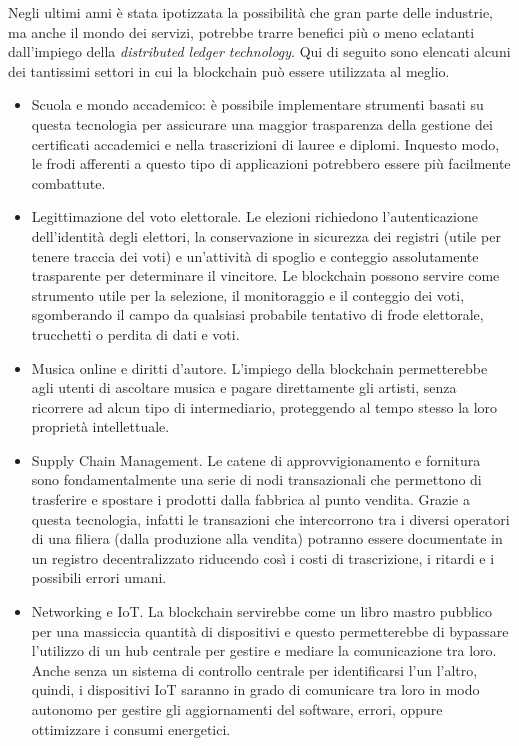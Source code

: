 Negli ultimi anni è stata ipotizzata la possibilità che gran parte delle industrie, ma anche il mondo dei servizi, potrebbe trarre benefici più o meno eclatanti dall’impiego della \textit{distributed ledger technology}\cite{Dieterich2017}.
Qui di seguito sono elencati alcuni dei tantissimi settori in cui la blockchain può essere utilizzata al meglio.

\begin{itemize}
    \item Scuola e mondo accademico: è possibile implementare strumenti basati su questa tecnologia per assicurare una maggior trasparenza della gestione dei certificati accademici e nella trascrizioni di lauree e diplomi. Inquesto modo, le frodi afferenti a questo tipo di applicazioni potrebbero essere più facilmente combattute.
    \item Legittimazione del voto elettorale. Le elezioni richiedono l’autenticazione dell’identità degli elettori, la conservazione in sicurezza dei registri (utile per tenere traccia dei voti) e un’attività di spoglio e conteggio assolutamente trasparente per determinare il vincitore. Le blockchain possono servire come strumento utile per la selezione, il monitoraggio e il conteggio dei voti, sgomberando il campo da qualsiasi probabile tentativo di frode elettorale, trucchetti o perdita di dati e voti.
    \item Musica online e diritti d'autore. L'impiego della blockchain permetterebbe agli utenti di ascoltare musica e  pagare direttamente gli artisti, senza ricorrere ad alcun tipo di intermediario, proteggendo al tempo stesso la loro proprietà intellettuale.
    \item Supply Chain Management. Le catene di approvvigionamento e fornitura sono fondamentalmente una serie di nodi transazionali che permettono di trasferire e spostare i prodotti dalla fabbrica al punto vendita. Grazie a questa tecnologia, infatti le transazioni che intercorrono tra i diversi operatori di una filiera (dalla produzione alla vendita) potranno essere documentate in un registro decentralizzato riducendo così i costi di trascrizione, i ritardi e i possibili errori umani.
    \item Networking e IoT. La blockchain servirebbe come un libro mastro pubblico per una massiccia quantità di dispositivi e questo permetterebbe di bypassare l’utilizzo di un hub centrale per gestire e mediare la comunicazione tra loro. Anche senza un sistema di controllo centrale per identificarsi l’un l’altro, quindi, i dispositivi IoT saranno in grado di comunicare tra loro in modo autonomo per gestire gli aggiornamenti del software, errori, oppure ottimizzare i consumi energetici.
\end{itemize}

